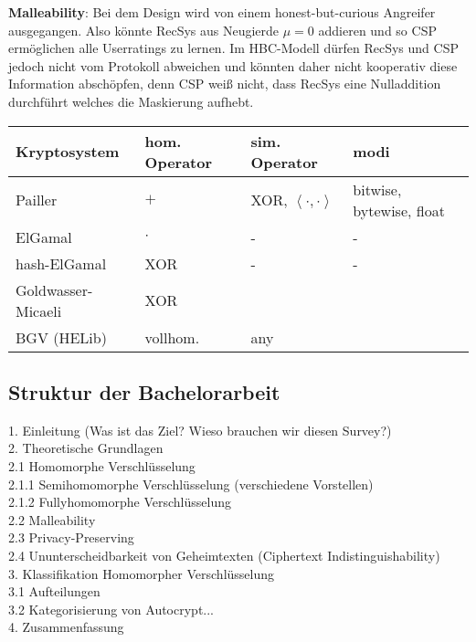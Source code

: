 \documentclass[12pt,a4paper]{scrartcl}				%
\begin{document}
\textbf{Malleability}: Bei dem Design wird von einem honest-but-curious Angreifer ausgegangen. Also könnte RecSys aus Neugierde $\mu=0$ addieren und so CSP ermöglichen alle Userratings zu lernen. Im HBC-Modell dürfen RecSys und CSP jedoch nicht vom Protokoll abweichen und könnten daher nicht kooperativ diese Information abschöpfen, denn CSP weiß nicht, dass RecSys eine Nulladdition durchführt welches die Maskierung aufhebt.

\begin{center}
	\begin{tabular}{ | l | l | l | p{5cm} |}
	 	\hline
 		Kryptosystem & hom. Operator & sim. Operator & modi \\ \hline
		Pailler & $+$ & XOR, $\left\langle\cdot,\cdot \right\rangle$  & bitwise, bytewise, float \\ \hline
		ElGamal & $\cdot$ & -  & - \\ \hline
		hash-ElGamal & XOR &  - & - \\ \hline
		Goldwasser-Micaeli & XOR & & \\ \hline
	    BGV (HELib) & vollhom. & any& \\ \hline
	\end{tabular}
\end{center}


\newpage
\subsection*{Struktur der Bachelorarbeit}
1. Einleitung (Was ist das Ziel? Wieso brauchen wir diesen Survey?)\\
2. Theoretische Grundlagen\\
2.1 Homomorphe Verschlüsselung\\
2.1.1 Semihomomorphe Verschlüsselung (verschiedene Vorstellen)\\
2.1.2 Fullyhomomorphe Verschlüsselung\\
2.2 Malleability\\
2.3 Privacy-Preserving\\
	2.4 Ununterscheidbarkeit von Geheimtexten (Ciphertext Indistinguishability)\\
3. Klassifikation Homomorpher Verschlüsselung\\
3.1 Aufteilungen\\
3.2 Kategorisierung von Autocrypt...\\
4. Zusammenfassung\\

\newpage

\small
\end{document}
